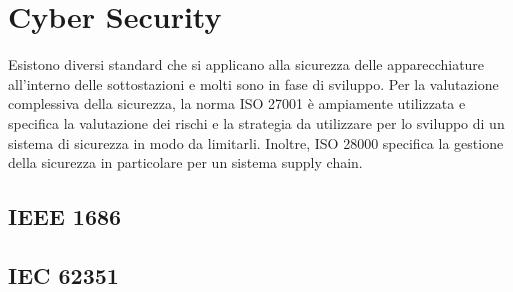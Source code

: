 \section{Cyber Security}
Esistono diversi standard che si applicano alla sicurezza delle apparecchiature all'interno delle sottostazioni e molti sono in fase di sviluppo. Per la valutazione complessiva della sicurezza, la norma ISO 27001 è ampiamente utilizzata e specifica la valutazione dei rischi  e la strategia da utilizzare per lo sviluppo di un sistema di sicurezza in modo da limitarli. Inoltre, ISO 28000 specifica la gestione della sicurezza in particolare per un sistema supply chain.
\subsection{IEEE 1686}
\subsection{IEC 62351}

